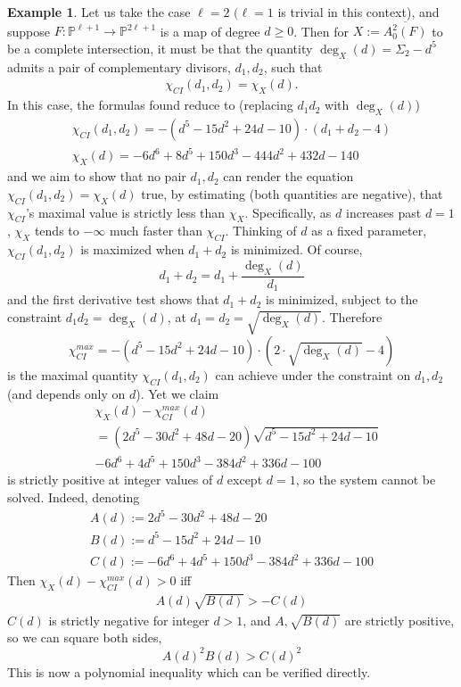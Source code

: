 \documentclass[11pt]{article}
\theoremstyle{plain}
\theoremstyle{definition}
\newtheorem{example}[fact]{Example}
\theoremstyle{definition}
\newcounter{equation}
\newcommand{\bb}[1]{\mathbb{#1}}
\begin{document}
\begin{example}
    Let us take the case $\ell=2$ $(\ell=1$ is trivial in this context), and suppose $F: \bb P^{\ell+1}\to \bb P^{2\ell+1}$ is a map of degree $d\geq 0$. Then for $X:=\overline{A_0^2(F)}$ to be a complete intersection, it must be that the quantity $\deg_X(d)=\Sigma_2-d^5$ admits a pair of complementary divisors, $d_1,d_2$, such that
    \begin{gather*}
    \chi_{CI}(d_1,d_2) = \chi_X(d).
    \end{gather*}
    In this case, the formulas found reduce to (replacing $d_1d_2$ with $\deg_X(d)$)
    \begin{gather*}
    \chi_{CI}(d_1,d_2) =-(d^5-15d^2+24d-10)\cdot (d_1+d_2-4) \\
    \chi_X(d) = -6d^6+8d^5+150d^3-444d^2+432d-140
    \end{gather*}
    and we aim to show that no pair $d_1,d_2$ can render the equation $\chi_{CI}(d_1,d_2) =\chi_X(d)$ true, by estimating (both quantities are negative), that $\chi_{CI}$'s maximal value is strictly less than $\chi_X$. Specifically, as $d$ increases past $d=1$, $\chi_X$ tends to $-\infty$ much faster than $\chi_{CI}$. Thinking of $d$ as a fixed parameter, $\chi_{CI}(d_1,d_2)$ is maximized when $d_1+d_2$ is minimized. Of course,
    \[
    d_1+d_2 = d_1 + \frac{\deg_X(d)}{d_1}
    \]
    and the first derivative test shows that $d_1+d_2$ is minimized, subject to the constraint $d_1d_2 = \deg_X(d)$, at $d_1 = d_2=\sqrt{\deg_X(d)}$. Therefore 
    \[
    \chi_{CI}^{max} = -(d^5-15d^2+24d-10)\cdot (2\cdot \sqrt{\deg_X(d)}-4)
    \]
    is the maximal quantity $\chi_{CI}(d_1,d_2)$ can achieve under the constraint on $d_1,d_2$ (and depends only on $d$). Yet we claim 
    \begin{align*}
    &\chi_X(d)-\chi^{max}_{CI}(d)\\
    &= ( 2{d}^{5}-30{d}^{2}+48d-20) \sqrt {{d}^{5}-15{d}
^{2}+24d-10}\\
&-6{d}^{6}+4{d}^{5}+150{d}^{3}-384{d}^{2}+336d-
100
    \end{align*}
    is strictly positive at integer values of $d$ except $d=1$, so the system cannot be solved. Indeed, denoting 
    \begin{gather*}
        A(d):=2d^5-30d^2+48d-20\\
        B(d):=d^5-15d^2+24d-10\\
        C(d):=-6{d}^{6}+4{d}^{5}+150{d}^{3}-384{d}^{2}+336d-100
    \end{gather*}
    Then $\chi_X(d)-\chi_{CI}^{max}(d)>0$ iff 
    \begin{gather*}
        A(d)\sqrt{B(d)}>-C(d)
    \end{gather*}
    $C(d)$ is strictly negative for integer $d>1$, and $A,\sqrt{B(d)}$ are strictly positive, so we can square both sides,
    \[
    A(d)^2B(d)>C(d)^2
    \]
    This is now a polynomial inequality which can be verified directly. 
\end{example}
\end{document}
